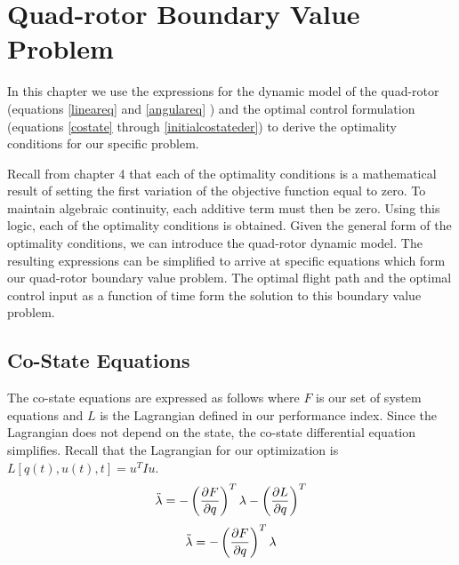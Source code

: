 
\chapter{Quad-rotor Boundary Value Problem} %

\label{Chapter5}


In this chapter we use the expressions for the dynamic model of the quad-rotor (equations \ref{lineareq} and \ref{angulareq} ) and the optimal control formulation (equations \ref{costate} through \ref{initialcostateder}) to derive the optimality conditions for our specific problem.

Recall from chapter 4 that each of the optimality conditions is a mathematical result of setting the first variation of the objective function equal to zero. To maintain algebraic continuity, each additive term must then be zero. Using this logic, each of the optimality conditions is obtained. Given the general form of the optimality conditions, we can introduce the quad-rotor dynamic model. The resulting expressions can be simplified to arrive at specific equations which form our quad-rotor boundary value problem. The optimal flight path and the optimal control input as a function of time form the solution to this boundary value problem.


\section{Co-State Equations}

The co-state equations are expressed as follows where $F$ is our set of system equations and $L$ is the Lagrangian defined in our performance index. Since the Lagrangian does not depend on the state, the co-state differential equation simplifies. Recall that the Lagrangian for our optimization is $ L[q(t),u(t),t] = u^T I u$.
\begin{equation}
    \ddot{\lambda} = -\left(\frac{\partial F}{\partial q}\right)^T \lambda - \left(\frac{\partial L}{\partial q}\right)^T
\end{equation}
\begin{equation}
    \ddot{\lambda} = -\left(\frac{\partial F}{\partial q}\right)^T \lambda
\end{equation}

